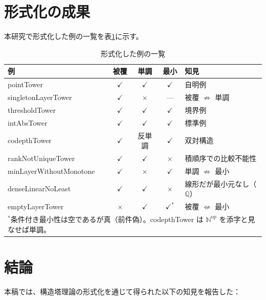 \documentclass[a4paper,11pt]{ltjsarticle}
\theoremstyle{definition}
\theoremstyle{plain}
\theoremstyle{remark}
\newcommand{\N}{\mathbb{N}}
\begin{document}
\section{形式化の成果}

本研究で形式化した例の一覧を表\ref{tab:examples}に示す。

\begin{table}[htbp]
\centering
\caption{形式化した例の一覧}
\label{tab:examples}
\small
\begin{tabular}{|l|c|c|c|l|}
\hline
\textbf{例} & \textbf{被覆} & \textbf{単調} & \textbf{最小} & \textbf{知見} \\
\hline
pointTower & $\checkmark$ & $\checkmark$ & $\checkmark$ & 自明例 \\
singletonLayerTower & $\checkmark$ & $\times$ & — & 被覆 $\not\Rightarrow$ 単調 \\
thresholdTower & $\checkmark$ & $\checkmark$ & $\checkmark$ & 境界例 \\
intAbsTower & $\checkmark$ & $\checkmark$ & $\checkmark$ & 標準例 \\
codepthTower & $\checkmark$ & 反単調 & $\checkmark$ & 双対構造 \\
\hline
rankNotUniqueTower & $\checkmark$ & $\checkmark$ & $\times$ & 積順序での比較不能性 \\
minLayerWithoutMonotone & $\checkmark$ & $\times$ & $\checkmark$ & 単調 $\not\Rightarrow$ 最小 \\
denseLinearNoLeast & $\checkmark$ & $\checkmark$ & $\times$ & 線形だが最小元なし（$\mathbb{Q}$） \\
emptyLayerTower & $\times$ & $\checkmark$ & $\checkmark^*$ & 被覆 $\not\Leftarrow$ 最小 \\
\hline
\multicolumn{5}{l}{\scriptsize $^*$条件付き最小性は空であるが真（前件偽）。codepthTower は $\N^{\mathrm{op}}$ を添字と見なせば単調。}
\end{tabular}
\end{table}

\section{結論}

本稿では、構造塔理論の形式化を通じて得られた以下の知見を報告した：
\end{document}

